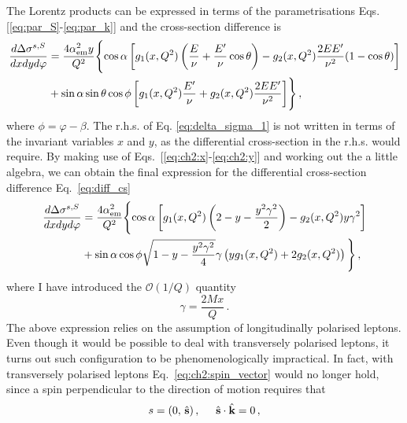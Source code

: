 The Lorentz products can be expressed in terms of the parametrisations Eqs. [\ref{eq:par_S}-\ref{eq:par_k}] and the cross-section difference is
\begin{equation}
  \begin{split}
    \frac{d \Delta \sigma^{s,S}}{dx dy d\varphi} & = \frac{4 \alpha_{\textrm{em}}^2 y}{Q^2} \Biggl\{ \cos \alpha \left[ g_1(x,Q^2) \left( \frac{E}{\nu} + \frac{E'}{\nu} \cos \theta \right) - g_2(x,Q^2) \frac{2 E E'}{\nu^2} (1 - \cos \theta) \right] \Biggr. \\
    & + \Biggl. \sin\alpha \sin\theta \cos\phi \left[ g_1(x,Q^2) \frac{E'}{\nu} + g_2(x,Q^2) \frac{2EE'}{\nu^2} \right] \Biggr\}\,,
  \end{split}
  \label{eq:delta_sigma_1}
\end{equation}
where $\phi = \varphi - \beta$.
The r.h.s. of Eq. \eqref{eq:delta_sigma_1} is not written in terms of the invariant variables $x$ and $y$, as the differential cross-section in the r.h.s. would require. By making use of Eqs.~[\ref{eq:ch2:x}-\ref{eq:ch2:y}] and working out the a little algebra, we can obtain the final expression for the differential cross-section difference Eq.~\eqref{eq:diff_cs}
\begin{equation}
  \begin{split}
    \frac{d \Delta \sigma^{s,S}}{dx dy d\varphi} & = \frac{4 \alpha_{\textrm{em}}^2}{Q^2} \Biggl\{ \cos \alpha \left[ g_1(x,Q^2) \left( 2 - y - \frac{y^2 \gamma^2}{2} \right) - g_2(x,Q^2) y \gamma^2 \right] \Biggr.\\
    & + \sin \alpha \cos \phi \sqrt{1 - y - \frac{y^2 \gamma^2}{4}} \gamma \left( y g_1(x,Q^2) + 2 g_2(x,Q^2) \right) \Biggl. \Biggr\}\,,
  \end{split}
  \label{eq:cs_diff_fin_S}
\end{equation}
where I have introduced the $\mathcal{O}(1/Q)$ quantity 
\begin{equation}
  \gamma = \frac{2Mx}{Q} \,.
  \label{eq:gamma}
\end{equation}
The above expression relies on the assumption of longitudinally polarised leptons. Even though it would be possible to deal with transversely polarised leptons, it turns out such configuration to be phenomenologically impractical. In fact, with transversely polarised leptons Eq.~\eqref{eq:ch2:spin_vector} would no longer hold, since a spin perpendicular to the direction of motion requires that
\begin{equation}
  s = (0,\,\hat{\vb{s}})\,, \hspace{5mm} \hat{\vb{s}} \cdot \hat{\vb{k}} = 0 \,,
\end{equation}
